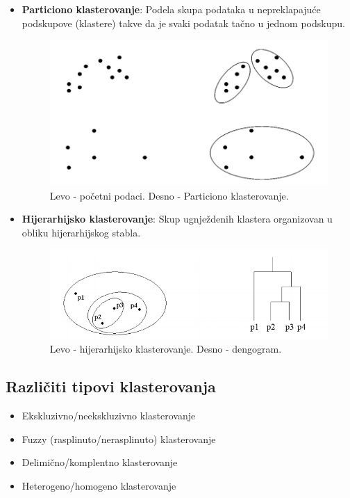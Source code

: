 \documentclass{article}
\begin{document}
\begin{itemize}

\item \textbf{Particiono klasterovanje}: Podela skupa podataka u nepreklapaju\'{c}e podskupove (klastere) takve da je svaki podatak ta\v{c}no u jednom podskupu.\\
\begin{figure}[h]
\selectfont
\centerline{\includegraphics[scale=0.35]{images/part_klast.png}}
\caption{Levo - po\v{c}etni podaci. Desno - Particiono klasterovanje.}
\end{figure}
\item \textbf{Hijerarhijsko klasterovanje}: Skup ugnje\v{z}denih klastera organizovan u obliku hijerarhijskog stabla.
\begin{figure}[h]
\selectfont
\centerline{\includegraphics[scale=0.45]{images/hie_clast.png}}
\caption{Levo - hijerarhijsko klasterovanje. Desno - dengogram.}
\end{figure}

\end{itemize}

\subsection{\selectfont Razli\v{c}iti tipovi klasterovanja}

\begin{itemize}
\item Ekskluzivno/neekskluzivno klasterovanje
\item {\selectfont Fuzzy} (rasplinuto/nerasplinuto) klasterovanje
\item Delimi\v{c}no/komplentno klasterovanje
\item Heterogeno/homogeno klasterovanje
\end{itemize}
\end{document}
